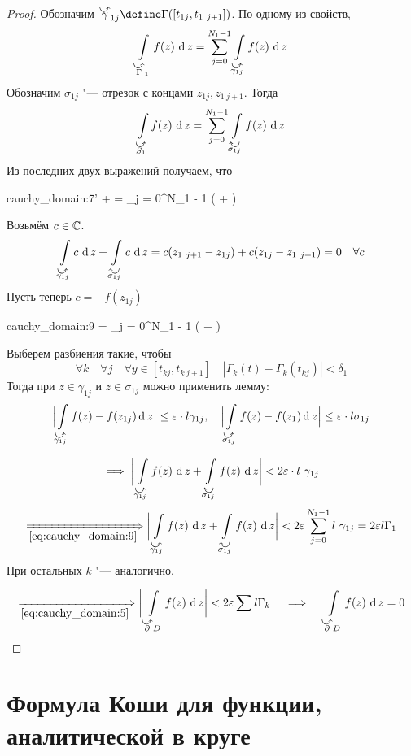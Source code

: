 \begin{proof}
	Обозначим $ \curvedir\gamma_{1j} \define \Gamma([t_{1j}, t_{1~j + 1}]) $. По одному из свойств,
	$$ \cint[z]{\curvedir\Gamma_1}{f(z)} = \sum_{j = 0}^{N_1 - 1} \cint[z]{\curvedir{\gamma_{1j}}}{f(z)} $$
	Обозначим $ \sigma_{1j} $ "--- отрезок с концами $ z_{1j}, z_{1~j + 1} $. Тогда
	$$ \cint[z]{\curvedir{S_1}}{f(z)} = \sum_{j = 0}^{N_1 - 1} \cint[z]{\curvedir[0]{\sigma_{1j}}}{f(z)} $$
	Из последних двух выражений получаем, что
	\begin{equ}{cauchy_domain:7'}
		 +  = \sum_{j = 0}^{N_1 - 1} \bigg(  +  \bigg)
	\end{equ}
	Возьмём $ c \in \mathbb{C} $.
	$$ \cint[z]{\curvedir{\gamma_{1j}}}c + \cint[z]{\curvedir[0]{\sigma_{1j}}}c = c(z_{1~j + 1} - z_{1j}) + c(z_{1j} - z_{1~j + 1}) = 0 \quad \forall c $$
	Пусть теперь $ c = -f(z_{1j}) $
	\begin{equ}{cauchy_domain:9}
		 = \sum_{j = 0}^{N_1 - 1} \bigg(  +  \bigg)
	\end{equ}
	Выберем разбиения такие, чтобы
	$$ \forall k \quad \forall j \quad \forall y \in [t_{kj}, t_{k~j + 1}] \quad |\Gamma_k(t) - \Gamma_k(t_{kj})| < \delta_1 $$
	Тогда при $ z \in \gamma_{1j} $ и $ z \in \sigma_{1j} $ можно применить лемму:
	$$ \Bigl| \int\limits_{\curvedir{\gamma_{1j}}} f(z) - f(z_{1j}) \di z \Bigr| \le \eps \cdot l \gamma_{1j}, \quad \Bigl| \int\limits_{\curvedir{\sigma_{1j}}} f(z) - f(z_1) \di z \Bigr| \le \eps \cdot l \sigma_{1j} $$

	$$ \implies \bigg| \cint[z]{\curvedir{\gamma_{1j}}}{f(z)} + \cint[z]{\curvedir[0]{\sigma_{1j}}}{f(z)} \bigg| < 2\eps \cdot l ~ \gamma_{1j} $$
	$$ \underimp{\eref{cauchy_domain:9}} \bigg| \cint[z]{\curvedir{\gamma_{1j}}}{f(z)} + \cint[z]{\curvedir[0]{\sigma_{1j}}}{f(z)} \bigg| < 2\eps \sum_{j = 0}^{N_1 - 1} l ~ \gamma_{1j} = 2 \eps l \Gamma_1 $$
	При остальных $ k $ "--- аналогично.

	$$ \underimp{\eref{cauchy_domain:5}} \bigg| \cint[z]{\curvedir\partial D}{f(z)} \bigg| < 2\eps \sum l \Gamma_k \quad
	\implies \quad \cint[z]{\curvedir\partial D}{f(z)} = 0 $$
\end{proof}

\section{Формула Коши для функции, аналитической в круге}

